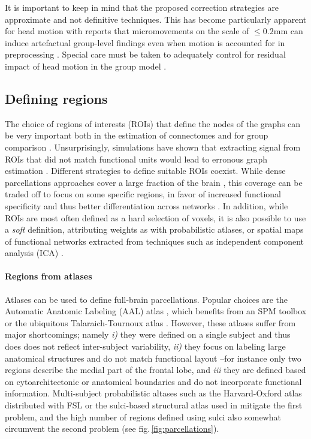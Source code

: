\documentclass[5p]{elsarticle}
\begin{document}
It is important to keep in mind that the proposed correction strategies
are approximate and not definitive techniques. This has become particularly
apparent for head motion with reports that micromovements on the scale
of $\le 0.2$mm can induce artefactual group-level findings even when motion is
accounted for in preprocessing
\cite{vandijk2012,power2011,satterthwaite2012}. Special care must be taken to
adequately control for residual impact of head motion in the group model
\cite{satterthwaite2012, vandijk2012}.

%

\subsection{Defining regions}

The choice of regions of interests (ROIs) that define the nodes of the
graphs can be very important both in the estimation of connectomes and
for group comparison \cite{wang2009}. Unsurprisingly, simulations have
shown that extracting signal from ROIs that did not match functional
units would lead to erronous graph estimation \cite{smith2011}.
%
Different strategies to define suitable ROIs coexist. While dense parcellations approaches cover
a large fraction of the brain \cite{achard2006, varoquaux2010c,
wang2009,bellec2006}, this coverage can be traded off to focus on some specific
regions, in favor of increased functional specificity and thus better
differentiation across networks \cite{greicius2003, dosenbach2006,
varoquaux2010b}. In addition, while
ROIs are most often defined as a hard selection of voxels, it is also
possible to use a \emph{soft} definition, attributing weights as with
probabilistic atlases, or spatial maps of functional networks extracted
from techniques such as independent component analysis (ICA) \cite{kiviniemi2009,smith2012}.

\paragraph{Regions from atlases}
%
Atlases can be used to define full-brain parcellations. Popular
choices are the Automatic Anatomic Labeling (AAL) atlas \cite{tzourio-mazoyer2002a}, 
which benefits from an SPM toolbox or the ubiquitous Talaraich-Tournoux
atlas \cite{talaraich1988}. 
However, these atlases suffer from major
shortcomings; namely \emph{i)} they were defined on a single subject
and thus does does not reflect inter-subject variability, \emph{ii)}
they focus on labeling large anatomical structures and do not match
functional layout --for instance only two regions describe the medial
part of the frontal lobe, and \emph{iii} they are defined based on
cytoarchitectonic or anatomical boundaries and do not incorporate functional
information. Multi-subject probabilistic altases such as the
Harvard-Oxford atlas distributed with FSL \cite{smith2004} or the
sulci-based structural atlas used in \cite{varoquaux2010c} mitigate the
first problem, and the high number of regions defined using sulci also
somewhat circumvent the second problem (see fig.\,\ref{fig:parcellations}).
\end{document}
